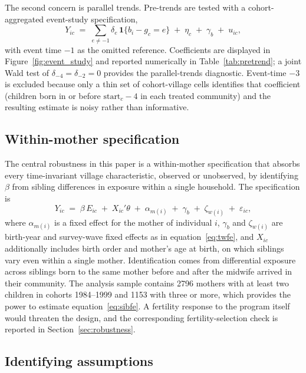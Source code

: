 The second concern is parallel trends. Pre-trends are tested with a cohort-aggregated event-study specification, \begin{equation} Y_{ic} \;=\; \sum_{e \neq -1} \delta_e \,\mathbf{1}\{b_i - g_c = e\} \;+\; \eta_c \;+\; \gamma_b \;+\; u_{ic}, \label{eq:sunab} \end{equation} with event time $-1$ as the omitted reference. Coefficients are displayed in Figure~\ref{fig:event_study} and reported numerically in Table~\ref{tab:pretrend}; a joint Wald test of $\delta_{-4} = \delta_{-2} = 0$ provides the parallel-trends diagnostic. Event-time $-3$ is excluded because only a thin set of cohort-village cells identifies that coefficient (children born in or before $\text{start}_c - 4$ in each treated community) and the resulting estimate is noisy rather than informative.

\subsection{Within-mother specification}

The central robustness in this paper is a within-mother specification that absorbs every time-invariant village characteristic, observed or unobserved, by identifying $\beta$ from sibling differences in exposure within a single household. The specification is \begin{equation} Y_{ic} \;=\; \beta\, E_{ic} \;+\; X_{ic}'\theta \;+\; \alpha_{m(i)} \;+\; \gamma_b \;+\; \zeta_{w(i)} \;+\; \varepsilon_{ic}, \label{eq:sibfe} \end{equation} where $\alpha_{m(i)}$ is a fixed effect for the mother of individual $i$, $\gamma_b$ and $\zeta_{w(i)}$ are birth-year and survey-wave fixed effects as in equation~\eqref{eq:twfe}, and $X_{ic}$ additionally includes birth order and mother's age at birth, on which siblings vary even within a single mother. Identification comes from differential exposure across siblings born to the same mother before and after the midwife arrived in their community. The analysis sample contains \num{2796} mothers with at least two children in cohorts 1984--1999 and \num{1153} with three or more, which provides the power to estimate equation~\eqref{eq:sibfe}. A fertility response to the program itself would threaten the design, and the corresponding fertility-selection check is reported in Section~\ref{sec:robustness}.

\subsection{Identifying assumptions}

